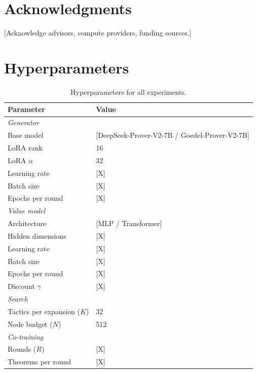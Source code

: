 \documentclass{article}
\begin{document}
\section*{Acknowledgments}

[Acknowledge advisors, compute providers, funding sources.]




\appendix

\section{Hyperparameters}
\label{app:hyperparams}

\begin{table}[h]
\centering
\caption{Hyperparameters for all experiments.}
\vspace{0.5em}
\begin{tabular}{ll}
\toprule
\textbf{Parameter} & \textbf{Value} \\
\midrule
\multicolumn{2}{l}{\textit{Generator}} \\
Base model & [DeepSeek-Prover-V2-7B / Goedel-Prover-V2-7B] \\
LoRA rank & 16 \\
LoRA $\alpha$ & 32 \\
Learning rate & [X] \\
Batch size & [X] \\
Epochs per round & [X] \\
\midrule
\multicolumn{2}{l}{\textit{Value model}} \\
Architecture & [MLP / Transformer] \\
Hidden dimensions & [X] \\
Learning rate & [X] \\
Batch size & [X] \\
Epochs per round & [X] \\
Discount $\gamma$ & [X] \\
\midrule
\multicolumn{2}{l}{\textit{Search}} \\
Tactics per expansion ($K$) & 32 \\
Node budget ($N$) & 512 \\
\midrule
\multicolumn{2}{l}{\textit{Co-training}} \\
Rounds ($R$) & [X] \\
Theorems per round & [X] \\
\bottomrule
\end{tabular}
\end{table}
\end{document}
